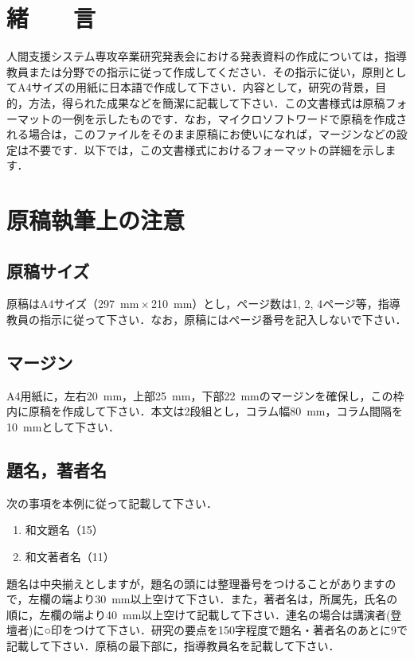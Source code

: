 \documentclass[
  form5,
  noadvisorfooter,
  rightauthor,
  subtitle
]{proceedings}
\begin{document}


\section{緒　　言}
人間支援システム専攻卒業研究発表会における発表資料の作成については，指導教員または分野での指示に従って作成してください．その指示に従い，原則としてA4サイズの用紙に日本語で作成して下さい．内容として，研究の背景，目的，方法，得られた成果などを簡潔に記載して下さい．この文書様式は原稿フォーマットの一例を示したものです．なお，マイクロソフトワードで原稿を作成される場合は，このファイルをそのまま原稿にお使いになれば，マージンなどの設定は不要です．以下では，この文書様式におけるフォーマットの詳細を示します．
\section{原稿執筆上の注意}
\subsection{原稿サイズ}
原稿はA4サイズ（\SI{297}{\milli\meter}\,$\times$\,\SI{210}{\milli\meter}）とし，ページ数は1, 2, 4ページ等，指導教員の指示に従って下さい．なお，原稿にはページ番号を記入しないで下さい．

\subsection{マージン}
A4用紙に，左右\SI{20}{\milli\meter}，上部\SI{25}{\milli\meter}，下部\SI{22}{\milli\meter}のマージンを確保し，この枠内に原稿を作成して下さい．本文は2段組とし，コラム幅\SI{80}{\milli\meter}，コラム間隔を\SI{10}{\milli\meter}として下さい．

\subsection{題名，著者名}
次の事項を本例に従って記載して下さい．
\begin{enumerate}
  \item 和文題名（\SI{15}{\point}）
  \item 和文著者名（\SI{11}{\point}）
\end{enumerate}
題名は中央揃えとしますが，題名の頭には整理番号をつけることがありますので，左欄の端より\SI{30}{\milli\meter}以上空けて下さい．また，著者名は，所属先，氏名の順に，左欄の端より\SI{40}{\milli\meter}以上空けて記載して下さい．連名の場合は講演者(登壇者)に○印をつけて下さい．研究の要点を150字程度で題名・著者名のあとに\SI{9}{\point}で記載して下さい．原稿の最下部に，指導教員名を記載して下さい．
\end{document}

